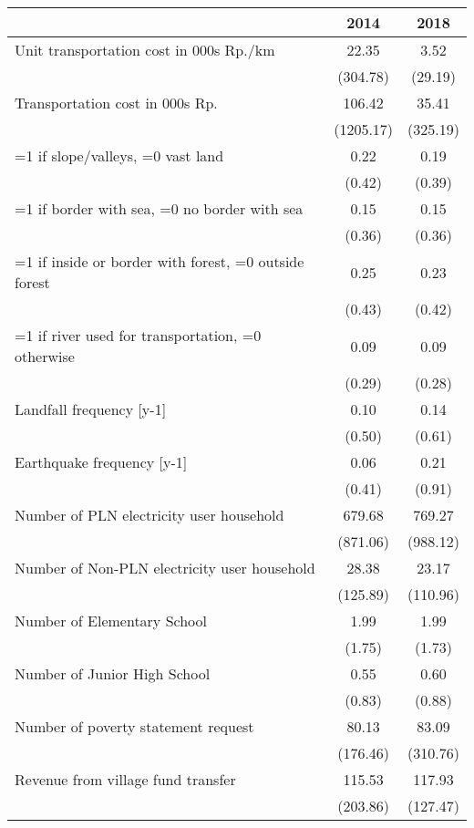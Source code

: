 \begin{tabular}{l*{2}{c}}
\hline\hline
                    &        2014&        2018\\
\hline
Unit transportation cost in 000s Rp./km&       22.35&        3.52\\
                    &    (304.78)&     (29.19)\\
[1em]
Transportation cost in 000s Rp.&      106.42&       35.41\\
                    &   (1205.17)&    (325.19)\\
[1em]
=1 if slope/valleys, =0 vast land&        0.22&        0.19\\
                    &      (0.42)&      (0.39)\\
[1em]
=1 if border with sea, =0 no border with sea&        0.15&        0.15\\
                    &      (0.36)&      (0.36)\\
[1em]
=1 if inside or border with forest, =0 outside forest&        0.25&        0.23\\
                    &      (0.43)&      (0.42)\\
[1em]
=1 if river used for transportation, =0 otherwise&        0.09&        0.09\\
                    &      (0.29)&      (0.28)\\
[1em]
Landfall frequency [y-1]&        0.10&        0.14\\
                    &      (0.50)&      (0.61)\\
[1em]
Earthquake frequency [y-1]&        0.06&        0.21\\
                    &      (0.41)&      (0.91)\\
[1em]
Number of PLN electricity user household&      679.68&      769.27\\
                    &    (871.06)&    (988.12)\\
[1em]
Number of Non-PLN electricity user household&       28.38&       23.17\\
                    &    (125.89)&    (110.96)\\
[1em]
Number of Elementary School&        1.99&        1.99\\
                    &      (1.75)&      (1.73)\\
[1em]
Number of Junior High School&        0.55&        0.60\\
                    &      (0.83)&      (0.88)\\
[1em]
Number of poverty statement request&       80.13&       83.09\\
                    &    (176.46)&    (310.76)\\
[1em]
Revenue from village fund transfer&      115.53&      117.93\\
                    &    (203.86)&    (127.47)\\
\hline\hline
\end{tabular}
